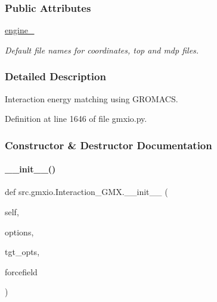 \subsubsection*{Public Attributes}
\begin{DoxyCompactItemize}
\item 
\hyperlink{classsrc_1_1gmxio_1_1Interaction__GMX_a98751cdf3eb6c64c424e9bb78c619e2d}{engine\+\_\+}
\begin{DoxyCompactList}\small\item\em Default file names for coordinates, top and mdp files. \end{DoxyCompactList}\end{DoxyCompactItemize}


\subsubsection{Detailed Description}
Interaction energy matching using G\+R\+O\+M\+A\+CS. 



Definition at line 1646 of file gmxio.\+py.



\subsubsection{Constructor \& Destructor Documentation}
\mbox{\label{classsrc_1_1gmxio_1_1Interaction__GMX_abf26d1083a7a68b119f684abf87e9d2b}} 
\paragraph{\texorpdfstring{\+\_\+\+\_\+init\+\_\+\+\_\+()}{\_\_init\_\_()}}
{\footnotesize\ttfamily def src.\+gmxio.\+Interaction\+\_\+\+G\+M\+X.\+\_\+\+\_\+init\+\_\+\+\_\+ (\begin{DoxyParamCaption}\item[{}]{self,  }\item[{}]{options,  }\item[{}]{tgt\+\_\+opts,  }\item[{}]{forcefield }\end{DoxyParamCaption})}



